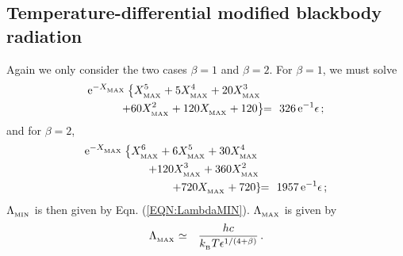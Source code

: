 \documentclass[usenatbib]{mn2e}
\numberwithin{equation}{section}
\begin{document}
\subsection{Temperature-differential modified blackbody radiation}

Again we only consider the two cases $\beta\!=\!1$ and $\beta\!=\!2$. For $\beta\!=\!1$, we must solve
\begin{eqnarray}\nonumber
{\rm e}^{-X_{_{\rm MAX}}}\left\{X_{_{\rm MAX}}^5+5X_{_{\rm MAX}}^4+20X_{_{\rm MAX}}^3\right.&&\\
\left.+60X_{_{\rm MAX}}^2+120X_{_{\rm MAX}}+120\right\}\!&\!=\!&\!326\,{\rm e}^{-1}\epsilon\,;
\end{eqnarray}
and for $\beta\!=\!2$,
\begin{eqnarray}\nonumber
{\rm e}^{-X_{_{\rm MAX}}}\left\{X_{_{\rm MAX}}^6+6X_{_{\rm MAX}}^5+30X_{_{\rm MAX}}^4\right.&&\\\nonumber
+120X_{_{\rm MAX}}^3+360X_{_{\rm MAX}}^2\\\nonumber
\left.+720X_{_{\rm MAX}}+720\right\}\!&\!=\!&\!1957\,{\rm e}^{-1}\epsilon\,;\\
\end{eqnarray}
$\Lambda_{_{\rm MIN}}$ is then given by Eqn. (\ref{EQN:LambdaMIN}). $\Lambda_{_{\rm MAX}}$ is given by
\begin{eqnarray}
\Lambda_{_{\rm MAX}}&\simeq&\frac{hc}{k_{_{\rm B}}T\epsilon^{1/(4+\beta)}}\,.
\end{eqnarray}
\end{document}
